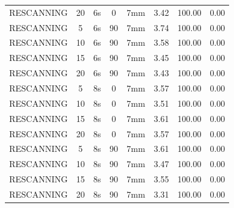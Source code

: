 \documentclass[type=dr, dr=rernat, accentcolor=tud7b,colorbacktitle, bigchapter, openright, twoside, 12pt ]{tudthesis}
\begin{document}
\begin{table}[H]
\begin{tabular}{|c|c||c|c|c||c|c|c|}
RESCANNING & 20 & 6s & 0 & 7mm & 3.42 & 100.00 & 0.00 \\
RESCANNING & 5 & 6s & 90 & 7mm & 3.74 & 100.00 & 0.00 \\
RESCANNING & 10 & 6s & 90 & 7mm & 3.58 & 100.00 & 0.00 \\
RESCANNING & 15 & 6s & 90 & 7mm & 3.45 & 100.00 & 0.00 \\
RESCANNING & 20 & 6s & 90 & 7mm & 3.43 & 100.00 & 0.00 \\
RESCANNING & 5 & 8s & 0 & 7mm & 3.57 & 100.00 & 0.00 \\
RESCANNING & 10 & 8s & 0 & 7mm & 3.51 & 100.00 & 0.00 \\
RESCANNING & 15 & 8s & 0 & 7mm & 3.61 & 100.00 & 0.00 \\
RESCANNING & 20 & 8s & 0 & 7mm & 3.57 & 100.00 & 0.00 \\
RESCANNING & 5 & 8s & 90 & 7mm & 3.61 & 100.00 & 0.00 \\
RESCANNING & 10 & 8s & 90 & 7mm & 3.47 & 100.00 & 0.00 \\
RESCANNING & 15 & 8s & 90 & 7mm & 3.55 & 100.00 & 0.00 \\
RESCANNING & 20 & 8s & 90 & 7mm & 3.31 & 100.00 & 0.00 \\
     \hline\hline 
  \end{tabular}
  \label{tab:pat09:RPV:rescan}
\end{table}   
\end{document}
